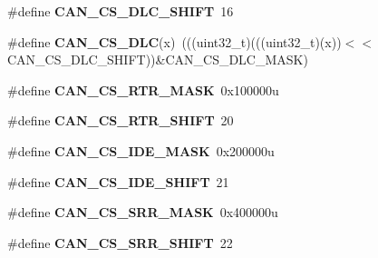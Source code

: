\begin{DoxyCompactItemize}
\item 
\#define {\bfseries C\+A\+N\+\_\+\+C\+S\+\_\+\+D\+L\+C\+\_\+\+S\+H\+I\+FT}~16\hypertarget{group__CAN__Register__Masks_ga4e110f941e1580ad04b71b8ee68605ce}{}\label{group__CAN__Register__Masks_ga4e110f941e1580ad04b71b8ee68605ce}

\item 
\#define {\bfseries C\+A\+N\+\_\+\+C\+S\+\_\+\+D\+LC}(x)~(((uint32\+\_\+t)(((uint32\+\_\+t)(x))$<$$<$C\+A\+N\+\_\+\+C\+S\+\_\+\+D\+L\+C\+\_\+\+S\+H\+I\+FT))\&C\+A\+N\+\_\+\+C\+S\+\_\+\+D\+L\+C\+\_\+\+M\+A\+SK)\hypertarget{group__CAN__Register__Masks_ga5c0c74dd9d5bddf256e4badb7ba3d9c6}{}\label{group__CAN__Register__Masks_ga5c0c74dd9d5bddf256e4badb7ba3d9c6}

\item 
\#define {\bfseries C\+A\+N\+\_\+\+C\+S\+\_\+\+R\+T\+R\+\_\+\+M\+A\+SK}~0x100000u\hypertarget{group__CAN__Register__Masks_ga64cd76de04f63c4e897feab93243a4d1}{}\label{group__CAN__Register__Masks_ga64cd76de04f63c4e897feab93243a4d1}

\item 
\#define {\bfseries C\+A\+N\+\_\+\+C\+S\+\_\+\+R\+T\+R\+\_\+\+S\+H\+I\+FT}~20\hypertarget{group__CAN__Register__Masks_ga3298f7864757605895c4495c51d4f675}{}\label{group__CAN__Register__Masks_ga3298f7864757605895c4495c51d4f675}

\item 
\#define {\bfseries C\+A\+N\+\_\+\+C\+S\+\_\+\+I\+D\+E\+\_\+\+M\+A\+SK}~0x200000u\hypertarget{group__CAN__Register__Masks_ga8195b85087fd378777c67830ac2ca9fb}{}\label{group__CAN__Register__Masks_ga8195b85087fd378777c67830ac2ca9fb}

\item 
\#define {\bfseries C\+A\+N\+\_\+\+C\+S\+\_\+\+I\+D\+E\+\_\+\+S\+H\+I\+FT}~21\hypertarget{group__CAN__Register__Masks_gae432768b4222f18cc1cec2b71ea8c579}{}\label{group__CAN__Register__Masks_gae432768b4222f18cc1cec2b71ea8c579}

\item 
\#define {\bfseries C\+A\+N\+\_\+\+C\+S\+\_\+\+S\+R\+R\+\_\+\+M\+A\+SK}~0x400000u\hypertarget{group__CAN__Register__Masks_gafd71067968d03b95e1dae32dc18ac578}{}\label{group__CAN__Register__Masks_gafd71067968d03b95e1dae32dc18ac578}

\item 
\#define {\bfseries C\+A\+N\+\_\+\+C\+S\+\_\+\+S\+R\+R\+\_\+\+S\+H\+I\+FT}~22\hypertarget{group__CAN__Register__Masks_ga77681ba56144cadb15bce536a1fd016d}{}\label{group__CAN__Register__Masks_ga77681ba56144cadb15bce536a1fd016d}


\end{DoxyCompactItemize}
